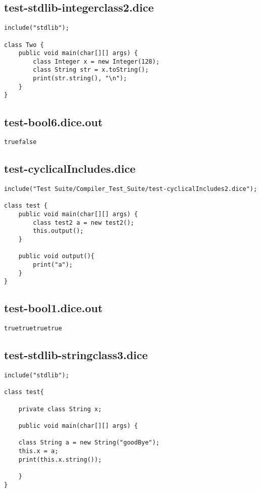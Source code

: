\subsection{test-stdlib-integerclass2.dice}
\begin{verbatim}
include("stdlib");

class Two {
	public void main(char[][] args) {
        class Integer x = new Integer(128);
        class String str = x.toString();
        print(str.string(), "\n");
	}
}

\end{verbatim}
\pagebreak
\subsection{test-bool6.dice.out}
\begin{verbatim}
truefalse
\end{verbatim}
\pagebreak
\subsection{test-cyclicalIncludes.dice}
\begin{verbatim}
include("Test Suite/Compiler_Test_Suite/test-cyclicalIncludes2.dice");

class test {
	public void main(char[][] args) {
        class test2 a = new test2();
        this.output();
	}

	public void output(){
		print("a");
	}
}

\end{verbatim}
\pagebreak
\subsection{test-bool1.dice.out}
\begin{verbatim}
truetruetruetrue
\end{verbatim}
\pagebreak
\subsection{test-stdlib-stringclass3.dice}
\begin{verbatim}
include("stdlib");

class test{
	
	private class String x;

	public void main(char[][] args) {

	class String a = new String("goodBye");
	this.x = a;
	print(this.x.string());
	
	}
}
\end{verbatim}
\pagebreak
